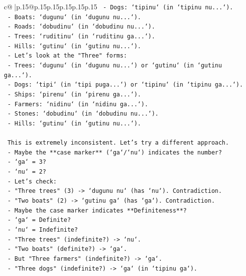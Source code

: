 \documentclass{article}
\begin{document}
{\begin{supertabular}{c@{$\;$}|p{.15\linewidth}@{}p{.15\linewidth}p{.15\linewidth}p{.15\linewidth}p{.15\linewidth}p{.15\linewidth}}
{{{\texttt{     {-} Dogs: `tipinu` (in `tipinu nu...`).} \\
\texttt{     {-} Boats: `dugunu` (in `dugunu nu...`).} \\
\texttt{     {-} Roads: `dobudinu` (in `dobudinu nu...`).} \\
\texttt{     {-} Trees: `ruditinu` (in `ruditinu ga...`).} \\
\texttt{     {-} Hills: `gutinu` (in `gutinu nu...`).} \\
\texttt{   {-} Let's look at the "Three" forms:} \\
\texttt{     {-} Trees: `dugunu` (in `dugunu nu...`) or `gutinu` (in `gutinu ga...`).} \\
\texttt{     {-} Dogs: `tipi` (in `tipi puga...`) or `tipinu` (in `tipinu ga...`).} \\
\texttt{     {-} Ships: `pirenu` (in `pirenu ga...`).} \\
\texttt{     {-} Farmers: `nidinu` (in `nidinu ga...`).} \\
\texttt{     {-} Stones: `dobudinu` (in `dobudinu nu...`).} \\
\texttt{     {-} Hills: `gutinu` (in `gutinu nu...`).} \\
\\ 
\texttt{   This is extremely inconsistent. Let's try a different approach.} \\
\texttt{   {-} Maybe the **case marker** (`ga`/`nu`) indicates the number?} \\
\texttt{     {-} `ga` = 3?} \\
\texttt{     {-} `nu` = 2?} \\
\texttt{     {-} Let's check:} \\
\texttt{       {-} "Three trees" (3) {-}> `dugunu nu` (has `nu`). Contradiction.} \\
\texttt{       {-} "Two boats" (2) {-}> `gutinu ga` (has `ga`). Contradiction.} \\
\texttt{   {-} Maybe the case marker indicates **Definiteness**?} \\
\texttt{     {-} `ga` = Definite?} \\
\texttt{     {-} `nu` = Indefinite?} \\
\texttt{     {-} "Three trees" (indefinite?) {-}> `nu`.} \\
\texttt{     {-} "Two boats" (definite?) {-}> `ga`.} \\
\texttt{     {-} But "Three farmers" (indefinite?) {-}> `ga`.} \\
\texttt{     {-} "Three dogs" (indefinite?) {-}> `ga` (in `tipinu ga`).} \\
}}}
\end{supertabular}}
\end{document}
